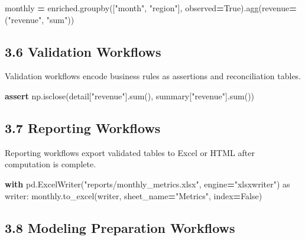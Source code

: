 \documentclass[
  12pt,
]{article}
\newenvironment{Shaded}{\begin{snugshade}}{\end{snugshade}}
\newcommand{\BuiltInTok}[1]{#1}
\newcommand{\ControlFlowTok}[1]{\textcolor[rgb]{0.13,0.29,0.53}{\textbf{#1}}}
\newcommand{\ImportTok}[1]{#1}
\newcommand{\NormalTok}[1]{#1}
\newcommand{\OperatorTok}[1]{\textcolor[rgb]{0.81,0.36,0.00}{\textbf{#1}}}
\newcommand{\StringTok}[1]{\textcolor[rgb]{0.31,0.60,0.02}{#1}}
\newcommand{\VariableTok}[1]{\textcolor[rgb]{0.00,0.00,0.00}{#1}}
\begin{document}
\begin{Shaded}
\begin{Highlighting}[]
\NormalTok{monthly }\OperatorTok{=}\NormalTok{ enriched.groupby([}\StringTok{"month"}\NormalTok{, }\StringTok{"region"}\NormalTok{], observed}\OperatorTok{=}\VariableTok{True}\NormalTok{).agg(revenue}\OperatorTok{=}\NormalTok{(}\StringTok{"revenue"}\NormalTok{, }\StringTok{"sum"}\NormalTok{))}
\end{Highlighting}
\end{Shaded}

\subsection{3.6 Validation Workflows}\label{validation-workflows}

Validation workflows encode business rules as assertions and
reconciliation tables.

\begin{Shaded}
\begin{Highlighting}[]
\ControlFlowTok{assert}\NormalTok{ np.isclose(detail[}\StringTok{"revenue"}\NormalTok{].}\BuiltInTok{sum}\NormalTok{(), summary[}\StringTok{"revenue"}\NormalTok{].}\BuiltInTok{sum}\NormalTok{())}
\end{Highlighting}
\end{Shaded}

\subsection{3.7 Reporting Workflows}\label{reporting-workflows}

Reporting workflows export validated tables to Excel or HTML after
computation is complete.

\begin{Shaded}
\begin{Highlighting}[]
\ControlFlowTok{with}\NormalTok{ pd.ExcelWriter(}\StringTok{"reports/monthly\_metrics.xlsx"}\NormalTok{, engine}\OperatorTok{=}\StringTok{"xlsxwriter"}\NormalTok{) }\ImportTok{as}\NormalTok{ writer:}
\NormalTok{    monthly.to\_excel(writer, sheet\_name}\OperatorTok{=}\StringTok{"Metrics"}\NormalTok{, index}\OperatorTok{=}\VariableTok{False}\NormalTok{)}
\end{Highlighting}
\end{Shaded}

\subsection{3.8 Modeling Preparation
Workflows}\label{modeling-preparation-workflows}
\end{document}
